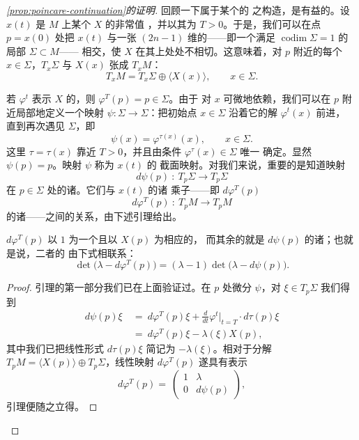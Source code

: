 \begin{proof}[\cref*{prop:poincare-continuation}的证明]
回顾一下属于某个\trPeriodicSolution{}的\trTransversalSection\trMapping{}%
之构造，是有益的。设 $x(t)$ 是 $M$ 上某个\trVectorField{} $X$ 的非常值%
\trPeriodicSolution，并以其\trPeriodic{}为 $T>0$。于是，我们可以在点%
$p=x(0)$ 处把 $x(t)$ 与一张 $(2n-1)$ 维的\trHypersurface——即一个满足%
$\operatorname{codim}\Sigma=1$ 的局部\trSubmanifold{} $\Sigma\subset M$——%
相交，使\trVectorField{} $X$ 在其上处处不相切。这意味着，对 $p$ 附近的每个%
$x\in\Sigma$，$T_{x}\Sigma$ 与 $X(x)$ 张成\trTangentSpace{} $T_{x}M$：
\[
T_{x}M=T_{x}\Sigma\oplus\bigl\langle X(x)\bigr\rangle,\qquad x\in\Sigma.
\]

若 $\varphi^{t}$ 表示 $X$ 的\trFlow，则 $\varphi^{T}(p)=p\in\Sigma$。由于%
\trFlow{}对 $x$ 可微地依赖，我们可以在 $p$ 附近局部地定义一个\trSmooth{}映射%
$\psi:\Sigma\to\Sigma$：把初始点 $x\in\Sigma$ 沿着它的解 $\varphi^{t}(x)$ 前进，%
直到再次遇见 $\Sigma$，即
\[
\psi(x)=\varphi^{\tau(x)}(x),\qquad x\in\Sigma.
\]
这里 $\tau=\tau(x)$ 靠近 $T>0$，并且由条件 $\varphi^{\tau}(x)\in\Sigma$ 唯一%
确定。显然 $\psi(p)=p$。映射 $\psi$ 称为\trPeriodicSolution{} $x(t)$ 的%
\trPoincare{}截面映射。对我们来说，重要的是知道\trLinearization{}映射
\[
d\psi(p)\ :\ T_{p}\Sigma\to T_{p}\Sigma
\]
在\trFixedPoint{} $p\in\Sigma$ 处的诸\trEigenvalue。它们与 $x(t)$ 的诸%
\trFloquet{}乘子——即 $d\varphi^{T}(p)$
\[
d\varphi^{T}(p)\ :\ T_{p}M\to T_{p}M
\]
的诸\trEigenvalue{}——之间的关系，由下述引理给出。

\begin{lemma}\label{lem:floquet-section-determinant}
$d\varphi^{T}(p)$ 以 $1$ 为一个\trEigenvalue{}且以 $X(p)$ 为相应的\trEigenvector，%
而其余的\trEigenvalue{}就是 $d\psi(p)$ 的诸\trEigenvalue；也就是说，二者的%
\trCharacteristicPolynomial{}由下式相联系：
\[
\det\bigl(\lambda-d\varphi^{T}(p)\bigr)=(\lambda-1)\det\bigl(\lambda-d\psi(p)\bigr).
\]
\end{lemma}
\begin{proof}
引理的第一部分我们已在上面验证过。在 $p$ 处微分 $\psi$，对%
$\xi\in T_{p}\Sigma$ 我们得到
\begin{align*}
d\psi(p)\xi\ &=\ d\varphi^{T}(p)\xi+\frac{d}{dt}\varphi^{t}\Big|_{t=T}\cdot d\tau(p)\xi\\
&=\ d\varphi^{T}(p)\xi-\lambda(\xi)X(p),
\end{align*}
其中我们已把线性形式 $d\tau(p)\xi$ 简记为 $-\lambda(\xi)$。相对于分解%
$T_{p}M=\langle X(p)\rangle\oplus T_{p}\Sigma$，线性映射 $d\varphi^{T}(p)$%
遂具有表示
\[
d\varphi^{T}(p)=\ \left(\begin{array}{c|c}
1 & \lambda\\
\hline
0 & d\psi(p)
\end{array}\right),
\]
引理便随之立得。
\end{proof}


\end{proof}

